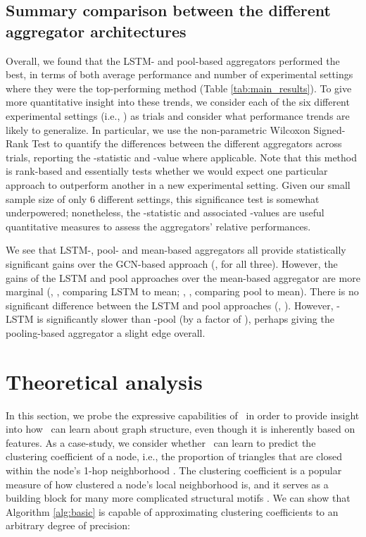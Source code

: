\subsection{Summary comparison between the different aggregator architectures}\label{inductive:sec:sensitivity}

Overall, we found that the LSTM- and pool-based aggregators performed the best, in terms of both average performance and number of experimental settings where they were the top-performing method (Table \ref{tab:main_results}).
To give more quantitative insight into these trends, we consider each of the six different experimental settings (i.e., ) as trials and consider what performance trends are likely to generalize.
In particular, we use the non-parametric Wilcoxon Signed-Rank Test \cite{siegal1956nonparametric} to quantify the differences between the different aggregators across trials, reporting the -statistic and -value where applicable. 
Note that this method is rank-based and essentially tests whether we would expect one particular approach to outperform another in a new experimental setting.
Given our small sample size of only 6 different settings, this significance test is somewhat underpowered; nonetheless, the -statistic and associated -values are useful quantitative measures to assess the aggregators' relative performances. 

We see that LSTM-, pool- and mean-based aggregators all provide statistically significant gains over the GCN-based approach (,  for all three). 
However, the gains of the LSTM and pool approaches over the mean-based aggregator are more marginal (, , comparing LSTM to mean; , , comparing pool to mean).
There is no significant difference between the LSTM and pool approaches (, ). 
However, \name-LSTM is significantly slower than \name-pool (by a factor of ), perhaps giving the pooling-based aggregator a slight edge overall. 


\section{Theoretical analysis}\label{inductive:sec:theory}

In this section, we probe the expressive capabilities of \name\ in order to 
provide insight into how \name\ can learn about graph structure, even though it is inherently based on features. 
As a case-study, we consider whether \name\ can learn to predict the clustering coefficient of a node, i.e., the proportion of triangles that are closed within the node's 1-hop neighborhood \cite{watts1998collective}.  The clustering coefficient is a popular  measure of how clustered a node's local neighborhood is, and it serves as a building block for many more complicated structural motifs \cite{benson2016higher}. We can show that Algorithm \ref{alg:basic} is capable of approximating clustering coefficients to an arbitrary degree of precision:

